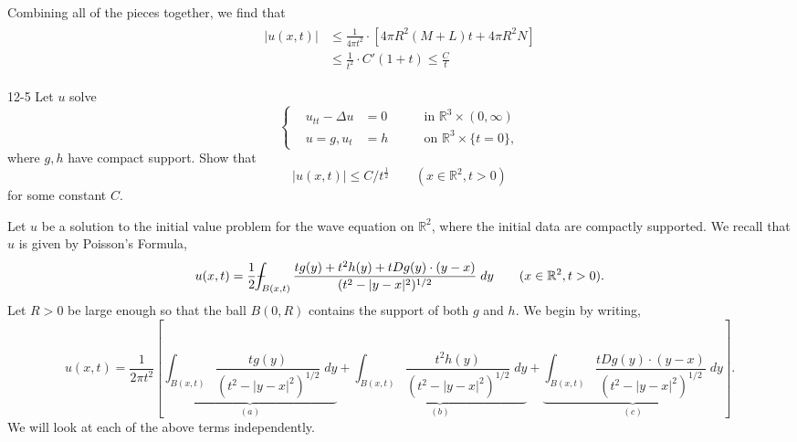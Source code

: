 \documentclass{article}
\def\Xint#1{\mathchoice
	{\XXint\displaystyle\textstyle{#1}}%
	{\XXint\textstyle\scriptstyle{#1}}%
	{\XXint\scriptstyle\scriptscriptstyle{#1}}%
	{\XXint\scriptscriptstyle\scriptscriptstyle{#1}}%
	\!\int}
\def\XXint#1#2#3{{\setbox0=\hbox{$#1{#2#3}{\int}$ }
		\vcenter{\hbox{$#2#3$ }}\kern-0.6\wd0}}
\def\dashint{\Xint-}
\numberwithin{equation}{section}
\begin{document}
	Combining all of the pieces together, we find that 
	\begin{align*}
		\begin{split}
			|u(x,t)| &\leq \frac{1}{4\pi t^2} \cdot \left[4\pi R^2(M + L)t + 4\pi R^2N\right] \\
			&\leq \frac{1}{t^2} \cdot C'(1 + t) \leq \frac{C}{t}
		\end{split}
	\end{align*}
	
	\begin{prb}{12-5}
		Let $u$ solve 
		\begin{equation*}
			\left\{
			\begin{alignedat}{3}
				&u_{tt} - \Delta u &=0 &\qquad \text{in $\mathbb{R}^3 \times (0,\infty)$} \\
				&u = g, u_t &= h &\qquad \text{on $\mathbb{R}^3 \times \{t = 0\}$},
			\end{alignedat}
			\right.
		\end{equation*}
		where $g, h$ have compact support. Show that    
		\begin{equation*}
			|u(x,t)| \leq C/t^{\frac{1}{2}} \qquad (x \in \mathbb{R}^2, t > 0)
		\end{equation*}
		for some constant $C$. 
	\end{prb}
	Let $u$ be a solution to the initial value problem for the wave equation on $\mathbb{R}^2$, where the initial data are compactly supported. We recall that $u$ is given by Poisson's Formula, 
	\begin{equation*}
		u(x, t)= \frac{1}{2}\dashint_{B(x,t)}\frac{tg(y) + t^2h(y) + tDg(y) \cdot (y - x)}{(t^2 - |y - x|^2)^{1/2}}\;dy \qquad (x \in \mathbb{R}^2, t > 0).
	\end{equation*}
	Let $R > 0$ be large enough so that the ball $B(0,R)$ contains the support of both $g$ and $h$. We begin by writing, 
	\begin{equation*}
		u(x,t) = \frac{1}{2\pi t^{2}}\left[\underbrace{\int_{B(x,t)}\frac{tg(y)}{(t^2 - |y - x|^2)^{1/2}}\;dy}_{(a)} + \underbrace{\int_{B(x,t)}\frac{t^2h(y)}{(t^2 - |y - x|^2)^{1/2}}\;dy}_{(b)} + \underbrace{\int_{B(x,t)}\frac{tDg(y) \cdot (y -x)}{(t^2 - |y - x|^2)^{1/2}}\;dy}_{(c)} \right]. 
	\end{equation*}
	We will look at each of the above terms independently. 
\end{document}

